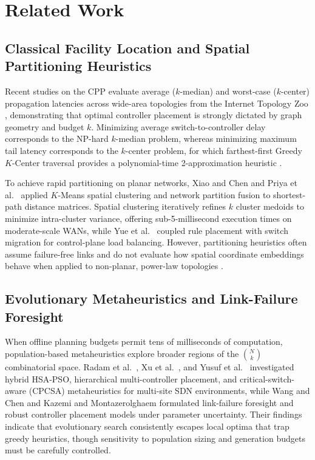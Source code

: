 \documentclass[conference]{IEEEtran}
\begin{document}
\section{Related Work}

\subsection{Classical Facility Location and Spatial Partitioning Heuristics}
Recent studies on the CPP evaluate average ($k$-median) and worst-case ($k$-center) propagation latencies across wide-area topologies from the Internet Topology Zoo \cite{mohanty2021, yusuf2023, vardhan2025}, demonstrating that optimal controller placement is strongly dictated by graph geometry and budget $k$. Minimizing average switch-to-controller delay corresponds to the NP-hard $k$-median problem, whereas minimizing maximum tail latency corresponds to the $k$-center problem, for which farthest-first Greedy $K$-Center traversal provides a polynomial-time 2-approximation heuristic \cite{mohanty2021, vardhan2025}.

To achieve rapid partitioning on planar networks, Xiao and Chen \cite{xiao2021} and Priya et al.\ \cite{priya2025} applied $K$-Means spatial clustering and network partition fusion to shortest-path distance matrices. Spatial clustering iteratively refines $k$ cluster medoids to minimize intra-cluster variance, offering sub-5-millisecond execution times on moderate-scale WANs, while Yue et al.\ \cite{yue2022} coupled rule placement with switch migration for control-plane load balancing. However, partitioning heuristics often assume failure-free links and do not evaluate how spatial coordinate embeddings behave when applied to non-planar, power-law topologies \cite{vardhan2025}.

\subsection{Evolutionary Metaheuristics and Link-Failure Foresight}
When offline planning budgets permit tens of milliseconds of computation, population-based metaheuristics explore broader regions of the $\binom{N}{k}$ combinatorial space. Radam et al.\ \cite{radam2022}, Xu et al.\ \cite{xu2023}, and Yusuf et al.\ \cite{yusuf2023} investigated hybrid HSA-PSO, hierarchical multi-controller placement, and critical-switch-aware (CPCSA) metaheuristics for multi-site SDN environments, while Wang and Chen \cite{wang2021} and Kazemi and Montazerolghaem \cite{kazemi2023} formulated link-failure foresight and robust controller placement models under parameter uncertainty. Their findings indicate that evolutionary search consistently escapes local optima that trap greedy heuristics, though sensitivity to population sizing and generation budgets must be carefully controlled.
\end{document}
